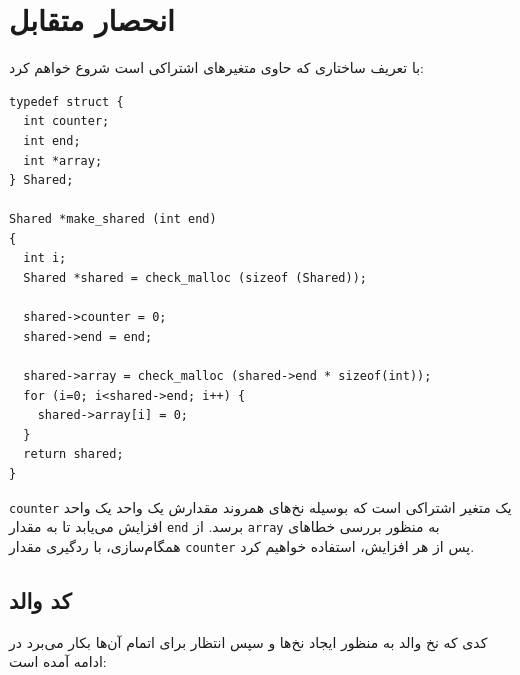\documentclass{book}
\begin{document}
\section{انحصار متقابل}

    با تعریف ساختاری که حاوی متغیرهای اشتراکی است شروع خواهم کرد:

\begin{latin}
\begin{lstlisting}
typedef struct {
  int counter;
  int end;
  int *array;
} Shared;

Shared *make_shared (int end)
{
  int i;
  Shared *shared = check_malloc (sizeof (Shared));

  shared->counter = 0;
  shared->end = end;

  shared->array = check_malloc (shared->end * sizeof(int));
  for (i=0; i<shared->end; i++) {
    shared->array[i] = 0;
  }
  return shared;
}
\end{lstlisting}
\end{latin}

    {\tt counter} یک متغیر  اشتراکی است که بوسیله نخ‌های همروند مقدارش یک واحد یک واحد  افزایش می‌یابد تا به مقدار   {\tt end} برسد. 
    از {\tt array}  به منظور بررسی خطاهای همگام‌سازی، با ردگیری مقدار {\tt counter} پس از هر افزایش، استفاده خواهیم کرد.


\subsection{کد والد}

    کدی که نخ والد به منظور ایجاد نخ‌ها  و سپس انتظار برای اتمام آن‌ها بکار می‌برد در ادامه آمده‌ است:
\end{document}
